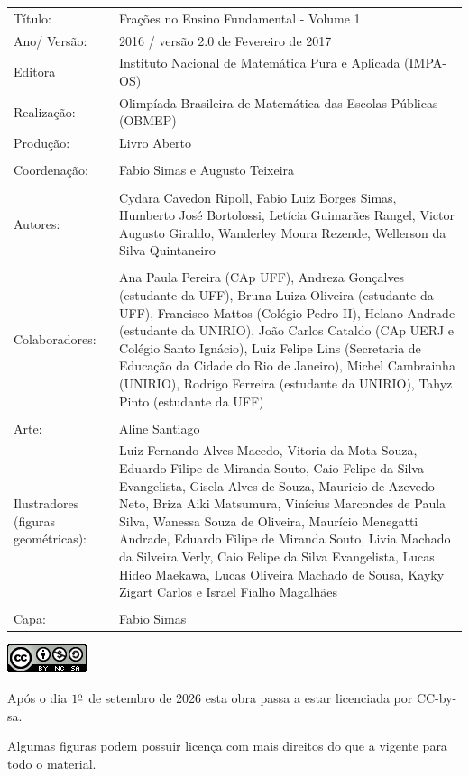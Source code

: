 \documentclass[a4,12pt]{book} %
\begin{document}
\begin{changemargin}{-5cm}{-5cm}
{\begin{center}
\begin{tabular}{p{}p{}}
Título: & Frações no Ensino Fundamental - Volume 1\\
Ano/ Versão: & 2016 / versão 2.0 de Fevereiro de 2017 \\
Editora & Instituto Nacional de Matem\'atica Pura e Aplicada (IMPA-OS)\\
Realização:& Olimp\'iada Brasileira de Matem\'atica das Escolas P\'ublicas (OBMEP)\\
Produção:& Livro Aberto\\
\\
Coordenação: & Fabio Simas e Augusto Teixeira\\
\\
Autores: & Cydara Cavedon Ripoll, Fabio Luiz Borges Simas, Humberto José Bortolossi, Letícia Guimarães Rangel, Victor Augusto Giraldo, Wanderley Moura Rezende, Wellerson  da Silva Quintaneiro\\
\\
Colaboradores: & Ana Paula Pereira (CAp UFF), Andreza Gonçalves (estudante da UFF), Bruna Luiza Oliveira (estudante da UFF), Francisco Mattos (Colégio Pedro II), Helano Andrade (estudante da UNIRIO), João Carlos Cataldo (CAp UERJ e Colégio Santo Ignácio), Luiz Felipe Lins (Secretaria de Educação da Cidade do Rio de Janeiro), Michel Cambrainha (UNIRIO), Rodrigo Ferreira (estudante da UNIRIO), Tahyz Pinto (estudante da UFF) \\
\\
Arte: & Aline Santiago
\\
Ilustradores (figuras geométricas): & Luiz Fernando Alves Macedo,
Vitoria da Mota Souza,
Eduardo Filipe de Miranda Souto,
Caio Felipe da Silva Evangelista,
Gisela Alves de Souza,
Mauricio de Azevedo Neto,
Briza Aiki Matsumura,
Vinícius Marcondes de Paula Silva,
Wanessa Souza de Oliveira,
Maurício Menegatti Andrade,
Eduardo Filipe de Miranda Souto,
Livia Machado da Silveira Verly,
Caio Felipe da Silva Evangelista,
Lucas Hideo Maekawa,
Lucas Oliveira Machado de Sousa,
Kayky Zigart Carlos e
Israel Fialho Magalhães\\
\\
Capa: & Fabio Simas
\end{tabular}
\vspace{.2cm}

\includegraphics[scale=1]{cc}

Após o dia $1^{\textrm{\underline{o}}}$ de setembro de 2026 esta obra passa a estar licenciada por CC-by-sa.

Algumas figuras podem possuir licença com mais direitos do que a vigente para todo o material.
\end{center}
}
\end{changemargin}
\end{document}

